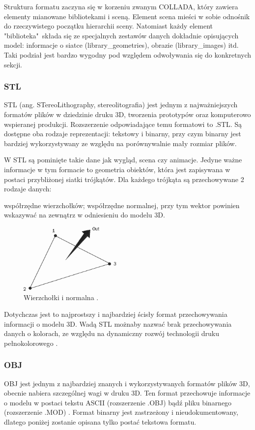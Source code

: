 Struktura formatu zaczyna się w korzeniu zwanym COLLADA, który zawiera elementy mianowane bibliotekami i sceną. Element scena mieści w sobie odnośnik do rzeczywistego początku hierarchii sceny. Natomiast każdy element "biblioteka"\ składa się ze specjalnych zestawów danych dokładnie opisujących model: informacje o siatce (library\_geometries), obrazie (library\_images) itd. Taki podział jest bardzo wygodny pod względem odwoływania się do konkretnych sekcji.  

\subsubsection{STL}
STL (ang. STereoLithography, stereolitografia) jest jednym z najważniejszych formatów plików w dziedzinie druku 3D, tworzenia prototypów oraz komputerowo wspieranej produkcji. Rozszerzenie odpowiadające temu formatowi to .STL. Są dostępne oba rodzaje reprezentacji: tekstowy i binarny, przy czym binarny jest bardziej wykorzystywany ze względu na porównywalnie mały rozmiar plików. 

W STL są pominięte takie dane jak wygląd, scena czy animacje. Jedyne ważne informacje w tym formacie to geometria obiektów, która jest zapisywana w postaci przybliżonej siatki trójkątów. Dla każdego trójkąta są przechowywane 2 rodzaje danych:
\begin{itemize}
\itemi współrzędne wierzchołków;
\itemi współrzędne normalnej, przy tym wektor powinien wskazywać na zewnątrz w odniesieniu do modelu 3D.
\end{itemize}
\begin{figure}[H]
		\centering
 		\includegraphics[width=5.0cm]{vertices-and-normal.png}
    	\caption{Wierzchołki i normalna \cite{stlinfo}.}
 		\label{rys6}
\end{figure}
 Dotychczas jest to najprostszy i najbardziej ścisły format przechowywania informacji o modelu 3D. Wadą STL możnaby nazwać brak przechowywania danych o kolorach, ze względu na dynamiczny rozwój technologii druku pełnokolorowego \cite{stlinfo}.

\subsubsection{OBJ}
OBJ jest jednym z najbardziej znanych i wykorzystywanych formatów plików 3D, obecnie nabiera szczególnej wagi w druku 3D. Ten format przechowuje informacje o modelu w postaci tekstu ASCII (rozszerzenie .OBJ) bądź pliku binarnego (rozszerzenie .MOD) \cite{objinfo}.
Format binarny jest zastrzeżony i nieudokumentowany, dlatego poniżej zostanie opisana tylko postać tekstowa formatu. 

